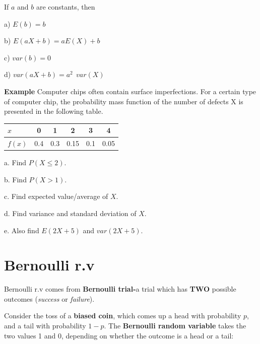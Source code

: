 \documentclass[
  11pt,
  letterpaper,
  DIV=11,
  numbers=noendperiod]{scrreprt}
\begin{document}
\begin{tcolorbox}[enhanced jigsaw, bottomrule=.15mm, toprule=.15mm, title=\textcolor{quarto-callout-note-color}{\faInfo}\hspace{0.5em}{Properties of E(.) and var(.)}, bottomtitle=1mm, colframe=quarto-callout-note-color-frame, coltitle=black, rightrule=.15mm, toptitle=1mm, colbacktitle=quarto-callout-note-color!10!white, titlerule=0mm, breakable, arc=.35mm, leftrule=.75mm, opacitybacktitle=0.6, opacityback=0, colback=white, left=2mm]

If \(a\) and \(b\) are constants, then

a) \(E(b)=b\)

b) \(E(aX+b)=aE(X)+b\)

c) \(var(b)=0\)

d) \(var(aX+b)=a^2 \ \ var (X)\)

\end{tcolorbox}

\textbf{Example} Computer chips often contain surface imperfections. For
a certain type of computer chip, the probability mass function of the
number of defects X is presented in the following table.

\begin{longtable}[]{@{}lccccc@{}}
\toprule\noalign{}
\(x\) & \textbf{0} & \textbf{1} & \textbf{2} & \textbf{3} &
\textbf{4} \\
\midrule\noalign{}
\endhead
\bottomrule\noalign{}
\endlastfoot
\(f(x)\) & 0.4 & 0.3 & 0.15 & 0.1 & 0.05 \\
\end{longtable}

a. Find \(P(X \le 2)\).

b. Find \(P(X > 1)\).

c. Find expected value/average of \(X\).

d. Find variance and standard deviation of \(X\).

e. Also find \(E(2X+5)\) and \(var(2X+5)\).

\section{Bernoulli r.v}\label{bernoulli-r.v}

Bernoulli r.v comes from \textbf{Bernoulli trial-}a trial which has
\textbf{TWO} possible outcomes (\emph{success} or \emph{failure}).

Consider the toss of a \textbf{biased coin}, which comes up a head with
probability \(p\), and a tail with probability \(1 - p\). The
\textbf{Bernoulli random variable} takes the two values 1 and 0,
depending on whether the outcome is a head or a tail:
\end{document}
